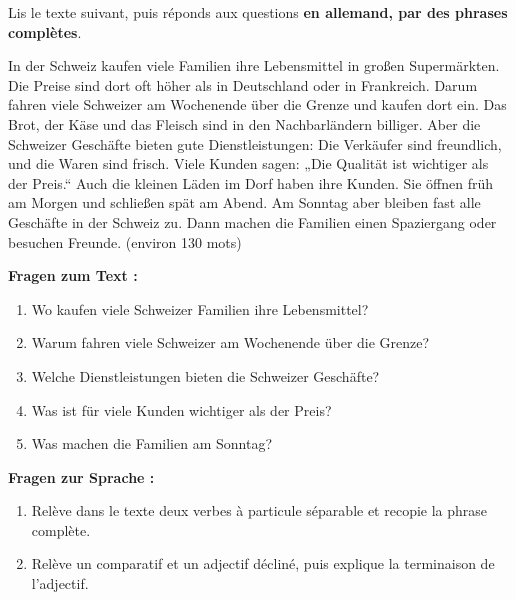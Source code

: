 \documentclass[11pt]{article}
\newcounter{popsec}
\newcounter{popsub}
\newcommand{\courssub}[1]{%
  \stepcounter{popsub}%
  \par\vspace{9pt}\noindent{\popxbold\fontsize{11.5}{13}\selectfont\color{popink}{\color{poporange}\thepopsec.\thepopsub}\hspace{6pt}#1}\par\nopagebreak\vspace{4pt}
}
\begin{document}
\courssub{Je me prépare au Bac}

\begin{exercice}
Lis le texte suivant, puis réponds aux questions \textbf{en allemand, par des phrases complètes}.
\begin{textebox}
In der Schweiz kaufen viele Familien ihre Lebensmittel in großen Supermärkten. Die Preise sind dort oft höher als in Deutschland oder in Frankreich. Darum fahren viele Schweizer am Wochenende über die Grenze und kaufen dort ein. Das Brot, der Käse und das Fleisch sind in den Nachbarländern billiger. Aber die Schweizer Geschäfte bieten gute Dienstleistungen: Die Verkäufer sind freundlich, und die Waren sind frisch. Viele Kunden sagen: „Die Qualität ist wichtiger als der Preis.“ Auch die kleinen Läden im Dorf haben ihre Kunden. Sie öffnen früh am Morgen und schließen spät am Abend. Am Sonntag aber bleiben fast alle Geschäfte in der Schweiz zu. Dann machen die Familien einen Spaziergang oder besuchen Freunde. (environ 130 mots)
\end{textebox}
\textbf{Fragen zum Text :}
\begin{enumerate}
\item Wo kaufen viele Schweizer Familien ihre Lebensmittel?
\item Warum fahren viele Schweizer am Wochenende über die Grenze?
\item Welche Dienstleistungen bieten die Schweizer Geschäfte?
\item Was ist für viele Kunden wichtiger als der Preis?
\item Was machen die Familien am Sonntag?
\end{enumerate}
\textbf{Fragen zur Sprache :}
\begin{enumerate}
\item Relève dans le texte deux verbes à particule séparable et recopie la phrase complète.
\item Relève un comparatif et un adjectif décliné, puis explique la terminaison de l'adjectif.
\end{enumerate}
\end{exercice}
\end{document}
